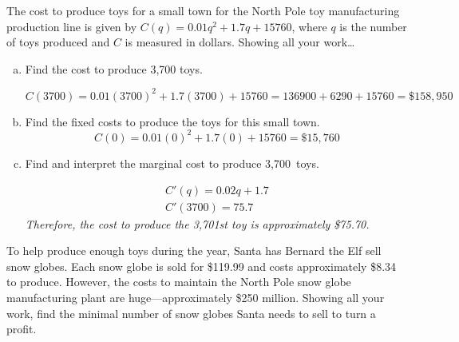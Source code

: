 \documentclass[12pt,letterpaper]{exam}
\begin{document}
\begin{questions}

\newpage
{} \par\vspace{0.3cm}

The cost to produce toys for a small town for the North Pole toy manufacturing production line is given by $C(q)= 0.01q^2 + 1.7q + 15760$, where $q$ is the number of toys produced and $C$ is measured in dollars. Showing all your work\dots
	\begin{enumerate}[(a)]
	\item Find the cost to produce 3,700 toys. \pspace
	
		\[
		C(3700)= 0.01(3700)^2 + 1.7(3700) + 15760= 136900 + 6290 + 15760= \$158,\!950
		\] \par\vspace{3.3cm}
	
	\item Find the fixed costs to produce the toys for this small town. \pspace
		\[
		C(0)= 0.01(0)^2 + 1.7(0) + 15760= \$15,\!760 
		\]  \pvspace{4cm}
	
	\item Find and interpret the marginal cost to produce 3,700~toys. \pspace
		
		{\itshape
			\[
			\begin{gathered}
			C'(q)= 0.02q + 1.7 \\[0.2cm]
			C'(3700)= 75.7
			\end{gathered}
			\] \pspace
		Therefore, the cost to produce the 3,701st toy is approximately \$75.70. 
		}
	\end{enumerate}



\newpage
{} \par\vspace{0.3cm}

To help produce enough toys during the year, Santa has Bernard the Elf sell snow globes. Each snow globe is sold for \$119.99 and costs approximately \$8.34 to produce. However, the costs to maintain the North Pole snow globe manufacturing plant are huge---approximately \$250 million. Showing all your work, find the minimal number of snow globes Santa needs to sell to turn a profit. \pspace


\end{questions}
\end{document}
